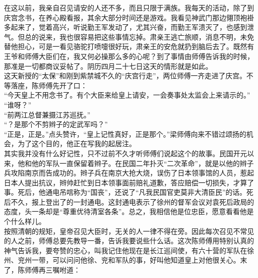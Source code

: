 在这以前，我亲自召见请安的人还不多，而且只限于满族。我每天的活动，除了到庆宫念书，在养心殿看报，其余大部分时间还是游戏。我看见神武门那边翎顶袍褂多起来了，觉着高兴，听说勤王军发动了，尤其兴奋，而勤王军溃灭了，也感到泄气。但总的说来，我也很容易把这些事情忘掉。肃亲王逃亡旅顺，消息不明，未免替他担心，可是一看见骆驼打喷嚏很好玩，肃亲王的安危就扔到脑后去了。既然有王爷和师傅大臣们在，我又何必操那么多的心呢？到了事情由师傅告诉我的时候，那准是一切都商议妥帖了。阴历四月二十七日这天的情形就是如此。\\

这天新授的“太保”和刚到紫禁城不久的“庆宫行走”，两位师傅一齐走进了庆宫。不等落座，陈师傅先开了口：\\

“今天皇上不用念书了。有个大臣来给皇上请安，一会奏事处太监会上来请示的。”\\

“谁呀？”\\

“前两江总督兼摄江苏巡抚。”\\

“？是那个不剪辫子的定武军吗？”\\

“正是，正是。”点头赞许，“皇上记性真好，正是那个。”梁师傅向来不错过颂扬的机会，为了这个目的，他正在写我的起居注。\\

其实我并没有什么好记性，只不过前不久才听师傅们说起这个的故事。民国开元以来，他和他的军队一直保留着辫子。在民国二年扑灭“二次革命”，就是以他的辫子兵攻陷南京而告成功的。辫子兵在南京大抢大烧，误伤了日本领事馆的人员，惹起日本人提出抗议，辫帅赶忙到日本领事面前赔礼道歉，答应赔偿一切损失，才算了事。死后，他通电吊唁称为“国丧”，还说了“凡我民国官吏莫非大清臣民”的话。死后不久，报上登出了的一封通电。这封通电表示了徐州的督军会议对袁死后政局的态度，头一条却是“尊重优待清室各条”。总之，我相信他是位忠臣，愿意看看他是个什么样儿。\\

按照清朝的规矩，皇帝召见大臣时，无关的人一律不得在旁。因此每次召见不常见的人之前，师傅总要先教导一番，告诉我要说些什么话。这次陈师傅用特别认真的神气告诉我，要夸赞的忠心，叫我记住他现在是长江巡间使，有六十营的军队在徐州、兖州一带，可以问问他徐、兖和军队的事，好叫他知道皇上对他很关心。末了，陈师傅再三嘱咐道：\\

